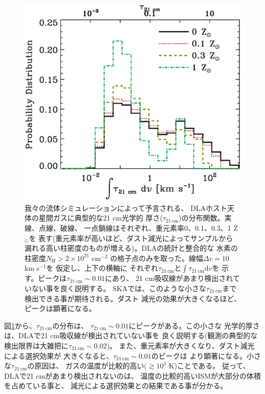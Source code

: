 \begin{figure}[thbp]
\begin{center}
\includegraphics[width=0.7\linewidth]{galaxy/Inttau_v3.eps}
\end{center}
\vspace{-0.5cm}
\caption{我々の流体シミュレーションによって予言される、
DLAホスト天体の星間ガスに典型的な21 cm光学的
厚さ($\tau_\mathrm{21~cm}$)の分布関数。実線、点線、破線、
一点鎖線はそれぞれ、重元素率0、0.1、0.3、1 Z$_\odot$を
表す(重元素率が高いほど、ダスト減光によってサンプルから
漏れる高い柱密度のものが増える)。DLAの統計と整合的な
水素の柱密度$N_\text{H}>2\times 10^{21}$ cm$^{-2}$
の格子点のみを取った。線幅$\Delta v=10$ km s$^{-1}$を
仮定し、上下の横軸に
それぞれ$\tau_\mathrm{21~cm}$と$\int\tau_\mathrm{21~cm}\mathrm{d}v$を
示す。ピークは$\tau_\mathrm{21~cm}\sim 0.01$にあり、
21 cm吸収線があまり検出されていない事を良く説明する。
SKAでは、このような小さな$\tau_\mathrm{21~cm}$まで
検出できる事が期待される。ダスト
減光の効果が大きくなるほど、ピークは顕著になる。}
\label{fig:distri_21cm}
\end{figure}

図\ref{fig:distri_21cm}から、$\tau_\mathrm{21~cm}$の分布は、
$\tau_\mathrm{21~cm}\sim 0.01$にピークがある。この小さな
光学的厚さは、DLAで21 cm吸収線が検出されていない事を
良く説明する(観測の典型的な検出限界は大雑把に$\tau_\mathrm{21~cm}\sim 0.02$)。
また、重元素率が大きくなり、ダスト減光による選択効果が
大きくなると、$\tau_\mathrm{21~cm}\sim 0.01$のピークは
より顕著になる。小さな$\tau_\mathrm{21~cm}$の原因は、
ガスの温度が比較的高い($\gtrsim 10^3$ K)ことである。
従って、DLAで21 cmがあまり検出されないのは、
温度の比較的高いISMが大部分の体積を占めている事と、
減光による選択効果との結果である事が分かる。

